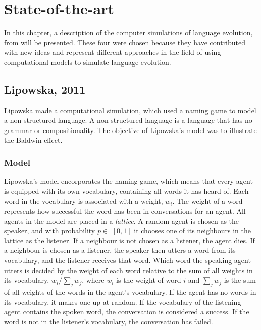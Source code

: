 \acresetall
\chapter{State-of-the-art}\label{ch:LitteratureStudy}

In this chapter, a description of the computer simulations of language evolution, from \citet{lipowska2011naming, gong2004computational, munroe2002learning, lekvam2014co} will be presented. These four were chosen because they have contributed with new ideas and represent different approaches in the field of using computational models to simulate language evolution.   

\section{Lipowska, 2011}\label{sec:Lipowska}
Lipowska made a computational simulation, which used a naming game to model a non-structured language. A non-structured language is a language that has no grammar or compositionality. The objective of Lipowska's model was to illustrate the Baldwin effect. 

\subsection{Model}
Lipowska's model encorporates the naming game, which means that every agent is equipped with its own vocabulary, containing all words it has heard of. Each word in the vocabulary is associated with a weight, $w_{i}$. The weight of a word represents how successful the word has been in conversations for an agent. All agents in the model are placed in a \textit{lattice}. A random agent is chosen as the speaker, and with probability $p\in$ $[0, 1]$ it chooses one of its neighbours in the lattice as the listener. If a neighbour is not chosen as a listener, the agent dies. If a neighbour is chosen as a listener, the speaker then utters a word from its vocabulary, and the listener receives that word. Which word the speaking agent utters is decided by the weight of each word relative to the sum of all weights in its vocabulary, $w_{i} / \sum_{j} w_{j}$, where $w_i$ is the weight of word $i$ and $\sum_{j} w_{j}$ is the sum of all weights of the words in the agent's vocabulary. If the agent has no words in its vocabulary, it makes one up at random. If the vocabulary of the listening agent contains the spoken word, the conversation is considered a success. If the word is not in the listener's vocabulary, the conversation has failed. 

